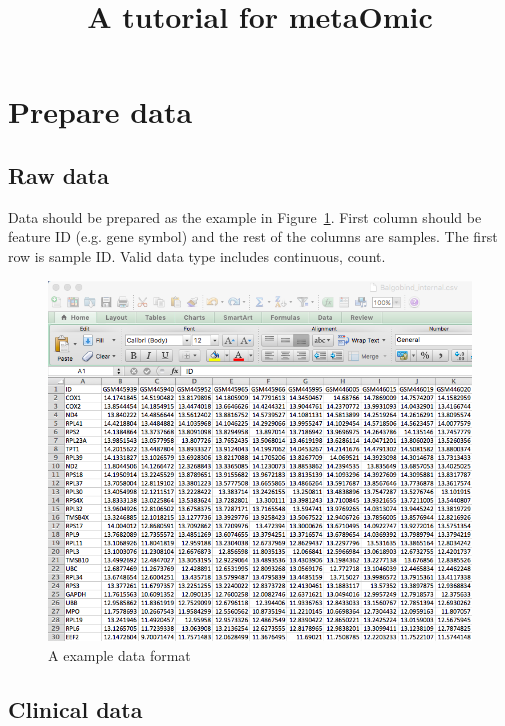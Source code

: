 \documentclass{article}
\title{A tutorial for metaOmic}
\author{}
\date{ }
\begin{document}
 
\maketitle
 
\tableofcontents
 
 
 
 
 
\section{Prepare data}
\label{sec:dataPrepare}
\subsection{Raw data}

Data should be prepared as the example in Figure~\ref{fig:dataMicroarray}.
First column should be feature ID (e.g. gene symbol) and the rest of the columns are samples.
The first row is sample ID.
Valid data type includes continuous, count.

\begin{figure}[H]
\begin{center}
\includegraphics[scale=0.5]{./figure/dataMicroarray}
\caption{A example data format}
\label{fig:dataMicroarray}
\end{center}
\end{figure}

\subsection{Clinical data}
\end{document}
